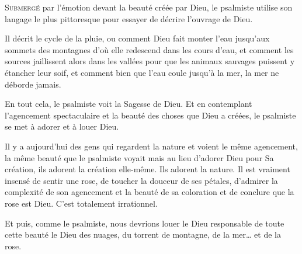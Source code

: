 \jrnlmonth





\lettrine{S}{ubmergé} par l'émotion devant la beauté créée par Dieu,
 le psalmiste utilise son langage le plus pittoresque pour essayer
 de décrire l'ouvrage de Dieu.

Il décrit le cycle de la pluie, 
 ou comment Dieu fait monter l'eau
 jusqu'aux sommets des montagnes
 d'où elle redescend dans les cours d'eau, 
 et comment les sources jaillissent alors dans les vallées pour que les animaux
 sauvages puissent y étancher leur soif, et comment bien que l'eau coule
 jusqu'à la mer, la mer ne déborde jamais.

En tout cela, le psalmiste voit la Sagesse de Dieu.
 Et en contemplant l'agencement spectaculaire et la beauté des choses que Dieu
 a créées, le psalmiste se met à adorer et à louer Dieu.

Il y a aujourd'hui des gens qui regardent la nature et voient le même agencement,
 la même beauté que le psalmiste voyait \ocadr{}mais au lieu d'adorer Dieu pour
 Sa création, ils adorent la création elle-même. Ils adorent la nature.
 Il est vraiment insensé de sentir une rose,
 de toucher la douceur de ses pétales, d'admirer la complexité de son agencement
 et la beauté de sa coloration et de conclure que la rose est Dieu. 
 C'est totalement irrationnel.


Et puis, comme le psalmiste, nous devrions louer le Dieu responsable
 de toute cette beauté \ocadr{}le Dieu des nuages, du torrent de montagne,
 de la mer\dots{} et de la rose. 

\dvrule



